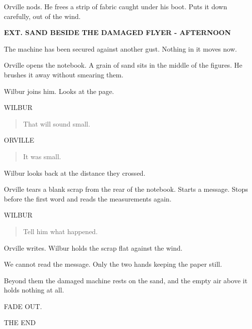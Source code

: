 \documentclass[12pt,letterpaper]{article}
\newcommand{\scene}[1]{\needspace{5\baselineskip}\vspace{8pt}\textbf{#1}\par}
\newcommand{\character}[1]{\needspace{4\baselineskip}\hspace*{2.2in}#1\par\nopagebreak}
\begin{document}
Orville nods. He frees a strip of fabric caught under his boot. Puts it down carefully, out of the wind.\par

\scene{EXT. SAND BESIDE THE DAMAGED FLYER - AFTERNOON}

The machine has been secured against another gust. Nothing in it moves now.\par

Orville opens the notebook. A grain of sand sits in the middle of the figures. He brushes it away without smearing them.\par

Wilbur joins him. Looks at the page.\par

\character{WILBUR}
\begin{quote}That will sound small.\par\end{quote}

\character{ORVILLE}
\begin{quote}It was small.\par\end{quote}

Wilbur looks back at the distance they crossed.\par

Orville tears a blank scrap from the rear of the notebook. Starts a message. Stops before the first word and reads the measurements again.\par

\character{WILBUR}
\begin{quote}Tell him what happened.\par\end{quote}

Orville writes. Wilbur holds the scrap flat against the wind.\par

We cannot read the message. Only the two hands keeping the paper still.\par

Beyond them the damaged machine rests on the sand, and the empty air above it holds nothing at all.\par

\begin{flushright}FADE OUT.\end{flushright}

\begin{flushright}THE END\end{flushright}
\end{document}

